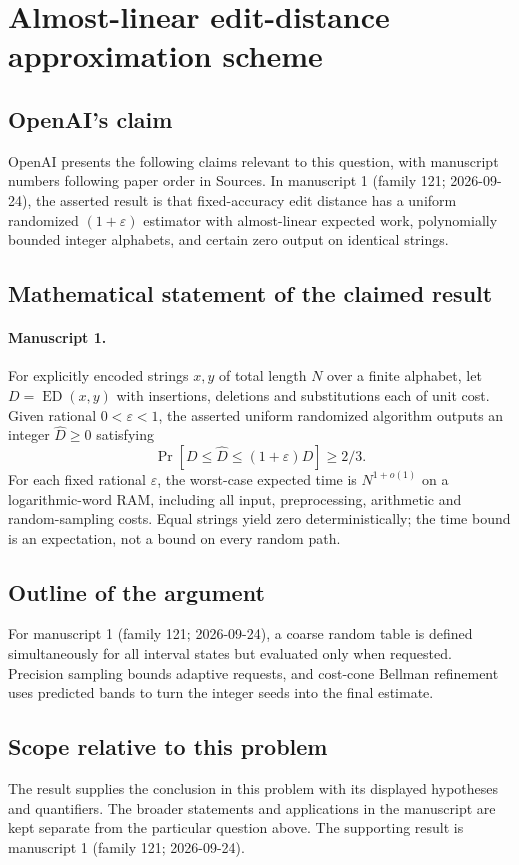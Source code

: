 \documentclass[11pt]{article}
\begin{document}
\section*{Almost-linear edit-distance approximation scheme}

\subsection{OpenAI's claim}
OpenAI presents the following claims relevant to this question, with manuscript numbers following paper order in Sources. In manuscript 1 (family 121; 2026-09-24), the asserted result is that fixed-accuracy edit distance has a uniform randomized $(1+\varepsilon)$ estimator with almost-linear expected work, polynomially bounded integer alphabets, and certain zero output on identical strings.

\subsection{Mathematical statement of the claimed result}
\paragraph{Manuscript 1.}
For explicitly encoded strings $x,y$ of total length $N$ over a finite alphabet, let $D=\operatorname{ED}(x,y)$ with insertions, deletions and substitutions each of unit cost. Given rational $0<\varepsilon<1$, the asserted uniform randomized algorithm outputs an integer $\widehat D\ge0$ satisfying
\[
 \Pr[D\le\widehat D\le(1+\varepsilon)D]\ge2/3.
\]
For each fixed rational $\varepsilon$, the worst-case expected time is $N^{1+o(1)}$ on a logarithmic-word RAM, including all input, preprocessing, arithmetic and random-sampling costs. Equal strings yield zero deterministically; the time bound is an expectation, not a bound on every random path.

\subsection{Outline of the argument}
For manuscript 1 (family 121; 2026-09-24), a coarse random table is defined simultaneously for all interval states but evaluated only when requested. Precision sampling bounds adaptive requests, and cost-cone Bellman refinement uses predicted bands to turn the integer seeds into the final estimate.

\subsection{Scope relative to this problem}
The result supplies the conclusion in this problem with its displayed hypotheses and quantifiers. The broader statements and applications in the manuscript are kept separate from the particular question above. The supporting result is manuscript 1 (family 121; 2026-09-24).
\end{document}
